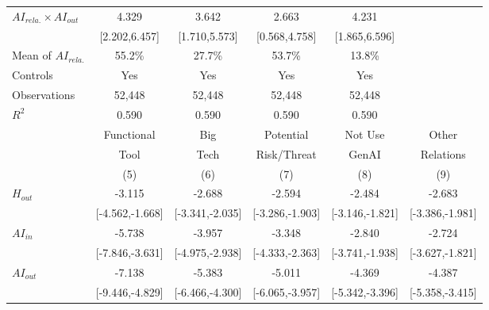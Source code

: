 \begin{table}[htbp]
\begin{threeparttable}
\begin{tabular}{l*{5}{c}}
\addlinespace
$AI_{rela.} \times AI_{out}$&                 4.329\sym{***}&                 3.642\sym{***}&                 2.663\sym{*}  &                 4.231\sym{***}\\
            &         [2.202,6.457]         &         [1.710,5.573]         &         [0.568,4.758]         &         [1.865,6.596]         \\
\midrule
Mean of $AI_{rela.}$&                55.2\%         &                27.7\%         &                53.7\%         &                13.8\%         \\
Controls    &                   Yes         &                   Yes         &                   Yes         &                   Yes         \\
Observations&                52,448         &                52,448         &                52,448         &                52,448         \\
$R^2$       &                 0.590         &                 0.590         &                 0.590         &                 0.590         \\
\midrule
 & Functional & Big & Potential & Not Use & Other \\
 & Tool & Tech & Risk/Threat & GenAI & Relations \\
\cmidrule(lr){2-6}
 & (5) & (6) & (7) & (8) & (9) \\
\midrule
\midrule
$H_{out}$   &                -3.115\sym{***}&                -2.688\sym{***}&                -2.594\sym{***}&                -2.484\sym{***}&                -2.683\sym{***}\\
            &       [-4.562,-1.668]         &       [-3.341,-2.035]         &       [-3.286,-1.903]         &       [-3.146,-1.821]         &       [-3.386,-1.981]         \\
\addlinespace
$AI_{in}$   &                -5.738\sym{***}&                -3.957\sym{***}&                -3.348\sym{***}&                -2.840\sym{***}&                -2.724\sym{***}\\
            &       [-7.846,-3.631]         &       [-4.975,-2.938]         &       [-4.333,-2.363]         &       [-3.741,-1.938]         &       [-3.627,-1.821]         \\
\addlinespace
$AI_{out}$  &                -7.138\sym{***}&                -5.383\sym{***}&                -5.011\sym{***}&                -4.369\sym{***}&                -4.387\sym{***}\\
            &       [-9.446,-4.829]         &       [-6.466,-4.300]         &       [-6.065,-3.957]         &       [-5.342,-3.396]         &       [-5.358,-3.415]         \\

\end{tabular}
\end{threeparttable}
\end{table}
